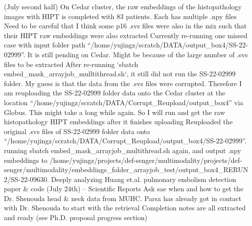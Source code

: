 \documentclass{article}%
\begin{document}
%
(July second half)%
\newline%
\newline%
%
On Cedar cluster, the raw embeddings of the histopathology images with HIPT is completed with 83 patients. Each has multiple .npy files %
\newline%
\newline%
%
Need to be careful that I think some p16 .svs files were also in the mix such that their HIPT raw embeddings were also extracted %
\newline%
\newline%
%
Currently re{-}running one missed case with input folder path “/home/yujingz/scratch/DATA/output\_box4/SS{-}22{-}02999”. It is still pending on Cedar. Might be because of the large number of .svs files to be extracted %
\newline%
\newline%
%
After re{-}running `sbatch embed\_mask\_arrayjob\_mulltithread.sh`, it still did not run the SS{-}22{-}02999 folder. My guess is that the data from the .svs files were corrupted. Therefore I am reuploading the SS{-}22{-}02999 folder data onto the Cedar cluster at the location “/home/yujingz/scratch/DATA/Corrupt\_Reupload/output\_box4” via Globus. This might take a long while again. So I will run and get the raw histopathology HIPT embeddings after it finishes uploading %
\newline%
\newline%
%
Reuploaded  the original .svs files of SS{-}22{-}02999 folder data onto “/home/yujingz/scratch/DATA/Corrupt\_Reupload/output\_box4/SS{-}22{-}02999”. running sbatch embed\_mask\_arrayjob\_multithread.sh again, and output .npy embeddings to /home/yujingz/projects/def{-}senger/multimodality/projects/def{-}senger/multimodality/embeddings\_folder\_arrayjob\_test/output\_box4\_RERUN2/SS{-}22{-}09630. %
\newline%
\newline%
%
Deeply analyzing Huang et.al. pulmonary embolism detection paper \& code (July 24th) – Scientific Reports %
\newline%
\newline%
%
Ask sae when and how to get the Dr. Shenouda head \& neck data from MUHC. %
\newline%
\newline%
%
Parsa has already got in contact with Dr. Shenouda to start with the retrieval %
\newline%
\newline%
%
Completion notes are all extracted and ready (see Ph.D. proposal progress section) %
\end{document}
